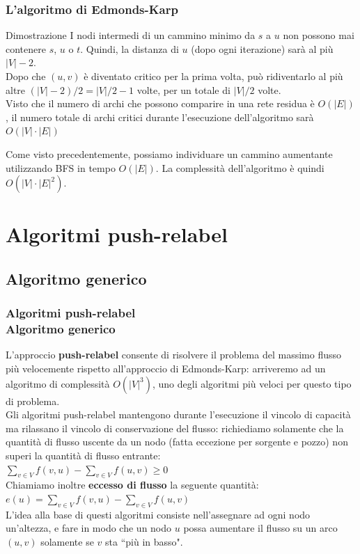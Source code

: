 \documentclass{beamer}
\begin{document}
\begin{frame}
\frametitle{L'algoritmo di Edmonds-Karp}
\begin{block}{Dimostrazione}
I nodi intermedi di un cammino minimo da $s$ a $u$ non possono mai contenere $s$, $u$ o $t$. Quindi, la distanza di $u$ (dopo ogni iterazione) sarà al più $|V|-2$.\\
Dopo che $(u,v)$ è diventato critico per la prima volta, può ridiventarlo al più altre $(|V|-2)/2=|V|/2-1$ volte, per un totale di $|V|/2$ volte.\\
Visto che il numero di archi che possono comparire in una rete residua è $O(|E|)$, il numero totale di archi critici durante l'esecuzione dell'algoritmo sarà $O(|V|\cdot|E|)$
\end{block}
Come visto precedentemente, possiamo individuare un cammino aumentante utilizzando BFS in tempo $O(|E|)$. La complessità dell'algoritmo è quindi
 $O(|V|\cdot|E|^2)$.
\end{frame}

\section{Algoritmi push-relabel}

\subsection{Algoritmo generico}

\begin{frame}
\frametitle{Algoritmi push-relabel\\Algoritmo generico}
L'approccio \textbf{push-relabel} consente di risolvere il problema del massimo flusso più velocemente rispetto all'approccio di Edmonds-Karp: arriveremo ad un algoritmo di complessità $O(|V|^3)$, uno degli algoritmi più veloci per questo tipo di problema.\\
Gli algoritmi push-relabel mantengono durante l'esecuzione il vincolo di capacità ma rilassano il vincolo di conservazione del flusso: richiediamo solamente che la quantità di flusso uscente da un nodo (fatta eccezione per sorgente e pozzo) non superi la quantità di flusso entrante:\\
$\sum\limits_{v\in V}f(v,u)-\sum\limits_{v\in V}f(u,v)\geq 0$\\
Chiamiamo inoltre \textbf{eccesso di flusso} la seguente quantità:\\
$e(u)=\sum\limits_{v\in V}f(v,u)-\sum\limits_{v\in V}f(u,v)$\\
L'idea alla base di questi algoritmi consiste nell'assegnare ad ogni nodo un'altezza, e fare in modo che un nodo $u$ possa aumentare il flusso su un arco $(u,v)$ solamente se $v$ sta ``più in basso".
\end{frame}
\end{document}
